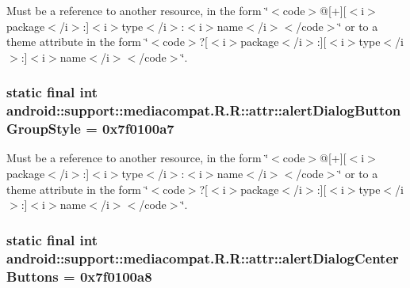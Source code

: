 Must be a reference to another resource, in the form \char`\"{}$<$code$>$@\mbox{[}+\mbox{]}\mbox{[}$<$i$>$package$<$/i$>$:\mbox{]}$<$i$>$type$<$/i$>$:$<$i$>$name$<$/i$>$$<$/code$>$\char`\"{} or to a theme attribute in the form \char`\"{}$<$code$>$?\mbox{[}$<$i$>$package$<$/i$>$:\mbox{]}\mbox{[}$<$i$>$type$<$/i$>$:\mbox{]}$<$i$>$name$<$/i$>$$<$/code$>$\char`\"{}. \hypertarget{classandroid_1_1support_1_1mediacompat_1_1_r_1_1attr_fc5ae725bf23e8fb64ef9bc0033c4e46}{
\subsubsection[{alertDialogButtonGroupStyle}]{\setlength{\rightskip}{0pt plus 5cm}static final int android::support::mediacompat.R.R::attr::alertDialogButtonGroupStyle = 0x7f0100a7}}
\label{classandroid_1_1support_1_1mediacompat_1_1_r_1_1attr_fc5ae725bf23e8fb64ef9bc0033c4e46}


Must be a reference to another resource, in the form \char`\"{}$<$code$>$@\mbox{[}+\mbox{]}\mbox{[}$<$i$>$package$<$/i$>$:\mbox{]}$<$i$>$type$<$/i$>$:$<$i$>$name$<$/i$>$$<$/code$>$\char`\"{} or to a theme attribute in the form \char`\"{}$<$code$>$?\mbox{[}$<$i$>$package$<$/i$>$:\mbox{]}\mbox{[}$<$i$>$type$<$/i$>$:\mbox{]}$<$i$>$name$<$/i$>$$<$/code$>$\char`\"{}. \hypertarget{classandroid_1_1support_1_1mediacompat_1_1_r_1_1attr_2cf3b2447a1198441284505ceb3f2b61}{
\subsubsection[{alertDialogCenterButtons}]{\setlength{\rightskip}{0pt plus 5cm}static final int android::support::mediacompat.R.R::attr::alertDialogCenterButtons = 0x7f0100a8}}
\label{classandroid_1_1support_1_1mediacompat_1_1_r_1_1attr_2cf3b2447a1198441284505ceb3f2b61}


